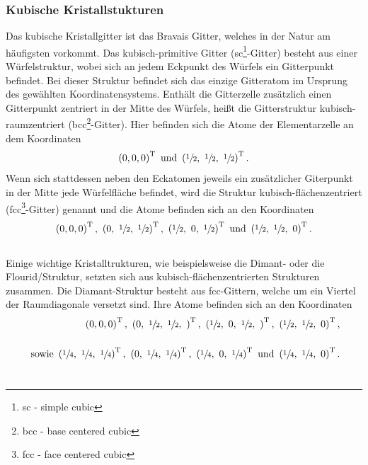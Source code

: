\subsubsection{Kubische Kristallstukturen}
\label{sec:kubisch}
Das kubische Kristallgitter ist das Bravais Gitter, welches in der Natur am häufigsten vorkommt.
Das kubisch-primitive Gitter (sc\footnote{sc - simple cubic}-Gitter) besteht aus einer Würfelstruktur, wobei sich an jedem Eckpunkt des Würfels ein Gitterpunkt befindet.
Bei dieser Struktur befindet sich das einzige Gitteratom im Ursprung des gewählten Koordinatensystems.
Enthält die Gitterzelle  zusätzlich einen Gitterpunkt zentriert in der Mitte des Würfels, heißt die Gitterstruktur kubisch-raumzentriert (bcc\footnote{bcc - base centered cubic}-Gitter).
Hier befinden sich die Atome der Elementarzelle an dem Koordinaten
\begin{equation*}
  \left(0,0,0\right)^\text{T}~\text{und}~  \left(\sfrac{1}{2},~\sfrac{1}{2},~\sfrac{1}{2}\right)^\text{T}.
\end{equation*}
Wenn sich stattdessen neben den Eckatomen jeweils ein zusätzlicher Giterpunkt in der Mitte jede Würfelfläche befindet, wird die Struktur kubisch-flächenzentriert (fcc\footnote{fcc - face centered cubic}-Gitter) genannt und die Atome befinden sich an den Koordinaten
\begin{equation*}
  \left(0,0,0\right)^\text{T},~  \left(0,~\sfrac{1}{2},~\sfrac{1}{2}\right)^\text{T},~  \left(\sfrac{1}{2},~0,~\sfrac{1}{2}\right)^\text{T}~\text{und}~  \left(\sfrac{1}{2},~\sfrac{1}{2},~0\right)^\text{T}.
\end{equation*}\\
Einige wichtige Kristalltrukturen, wie beispielsweise die Dimant- oder die Flourid\-/Struktur, setzten sich aus kubisch-flächenzentrierten Strukturen zusammen.
Die Diamant-Struktur besteht aus fcc-Gittern, welche um ein Viertel der Raumdiagonale versetzt sind.
Ihre Atome befinden sich an den Koordinaten
\begin{align*}
  \left(0,0,0\right)^\text{T},~  \left(0,~\sfrac{1}{2},~\sfrac{1}{2},~\right)^\text{T},~  \left(\sfrac{1}{2},~0,~\sfrac{1}{2},~\right)^\text{T},~  \left(\sfrac{1}{2},~\sfrac{1}{2},~0\right)^\text{T},\\~\\ ~\text{sowie}~ \left(\sfrac{1}{4},~\sfrac{1}{4},~\sfrac{1}{4}\right)^\text{T},~  \left(0,~\sfrac{1}{4},~\sfrac{1}{4}\right)^\text{T},~  \left(\sfrac{1}{4},~0,~\sfrac{1}{4}\right)^\text{T}~\text{und}~\left(\sfrac{1}{4},~\sfrac{1}{4},~0\right)^\text{T}.
\end{align*}\\
